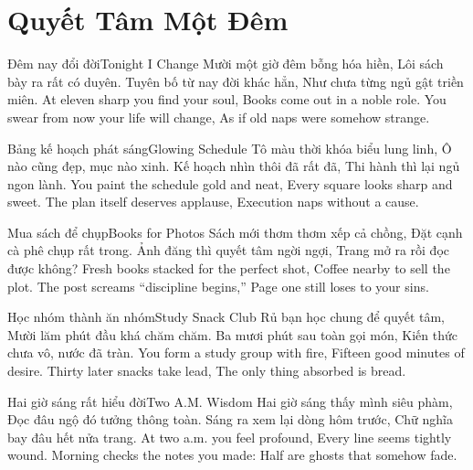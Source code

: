 \chapter{Quyết Tâm Một Đêm}

\begin{tutuyetbox}{Đêm nay đổi đời}{Tonight I Change}
Mười một giờ đêm bỗng hóa hiền,
Lôi sách bày ra rất có duyên.
Tuyên bố từ nay đời khác hẳn,
Như chưa từng ngủ gật triền miên.
\tcblower
At eleven sharp you find your soul,
Books come out in a noble role.
You swear from now your life will change,
As if old naps were somehow strange.
\end{tutuyetbox}

\begin{tutuyetbox}{Bảng kế hoạch phát sáng}{Glowing Schedule}
Tô màu thời khóa biểu lung linh,
Ô nào cũng đẹp, mục nào xinh.
Kế hoạch nhìn thôi đã rất đã,
Thi hành thì lại ngủ ngon lành.
\tcblower
You paint the schedule gold and neat,
Every square looks sharp and sweet.
The plan itself deserves applause,
Execution naps without a cause.
\end{tutuyetbox}

\begin{tutuyetbox}{Mua sách để chụp}{Books for Photos}
Sách mới thơm thơm xếp cả chồng,
Đặt cạnh cà phê chụp rất trong.
Ảnh đăng thì quyết tâm ngời ngợi,
Trang mở ra rồi đọc được không?
\tcblower
Fresh books stacked for the perfect shot,
Coffee nearby to sell the plot.
The post screams “discipline begins,”
Page one still loses to your sins.
\end{tutuyetbox}

\begin{tutuyetbox}{Học nhóm thành ăn nhóm}{Study Snack Club}
Rủ bạn học chung để quyết tâm,
Mười lăm phút đầu khá chăm chăm.
Ba mươi phút sau toàn gọi món,
Kiến thức chưa vô, nước đã tràn.
\tcblower
You form a study group with fire,
Fifteen good minutes of desire.
Thirty later snacks take lead,
The only thing absorbed is bread.
\end{tutuyetbox}

\begin{tutuyetbox}{Hai giờ sáng rất hiểu đời}{Two A.M. Wisdom}
Hai giờ sáng thấy mình siêu phàm,
Đọc đâu ngộ đó tưởng thông toàn.
Sáng ra xem lại dòng hôm trước,
Chữ nghĩa bay đâu hết nửa trang.
\tcblower
At two a.m. you feel profound,
Every line seems tightly wound.
Morning checks the notes you made:
Half are ghosts that somehow fade.
\end{tutuyetbox}

